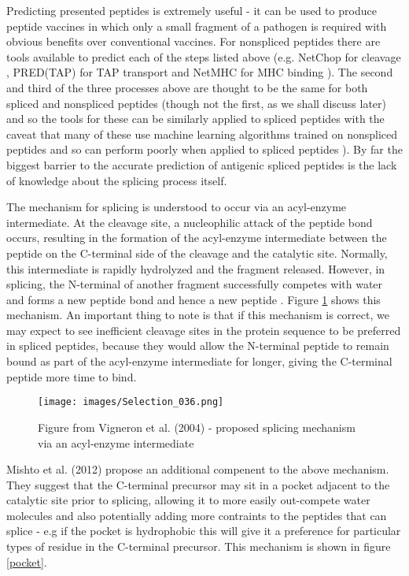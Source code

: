 \documentclass[10pt,a4paper,twoside,twocolumn]{article}
\begin{document}
Predicting presented peptides is extremely useful - it can be used to produce peptide vaccines in which only a small fragment of a pathogen is required with obvious benefits over conventional vaccines. For nonspliced peptides there are tools available to predict each of the steps listed above (e.g. NetChop for cleavage \cite{Nielsen2005}, PRED(TAP) for TAP transport \cite{Zhang2006} and NetMHC for MHC binding \cite{Nielsen2016}). The second and third of the three processes above are thought to be the same for both spliced and nonspliced peptides (though not the first, as we shall discuss later) and so the tools for these can be similarly applied to spliced peptides with the caveat that many of these use machine learning algorithms trained on nonspliced peptides and so can perform poorly when applied to spliced peptides \cite{Liepe2016}). By far the biggest barrier to the accurate prediction of antigenic spliced peptides is the lack of knowledge about the splicing process itself. 

The mechanism for splicing is understood to occur via an acyl-enzyme intermediate. At the cleavage site, a nucleophilic attack of the peptide bond occurs, resulting in the formation of the acyl-enzyme intermediate between the peptide on the C-terminal side of the cleavage and the catalytic site. Normally, this intermediate is rapidly hydrolyzed and the fragment released. However, in splicing, the N-terminal of another fragment successfully competes with water and forms a new peptide bond and hence a new peptide \cite{Vigneron2004}. Figure \ref{mechanism} shows this mechanism. An important thing to note is that if this mechanism is correct, we may expect to see inefficient cleavage sites in the protein sequence to be preferred in spliced peptides, because they would allow the N-terminal peptide to remain bound as part of the acyl-enzyme intermediate for longer, giving the C-terminal peptide more time to bind.
\begin{figure}
	\centering
	\texttt{[image: images/Selection\_036.png]}
	\caption{Figure from Vigneron et al. (2004) \cite{Vigneron2004} - proposed splicing mechanism via an acyl-enzyme intermediate}
	\label{mechanism}
\end{figure}

Mishto et al. (2012) \cite{Mishto2012} propose an additional compenent to the above mechanism. They suggest that the C-terminal precursor may sit in a pocket adjacent to the catalytic site prior to splicing, allowing it to more easily out-compete water molecules and also potentially adding more contraints to the peptides that can splice - e.g if the pocket is hydrophobic this will give it a preference for particular types of residue in the C-terminal precursor. This mechanism is shown in figure \ref{pocket}. 
\end{document}
